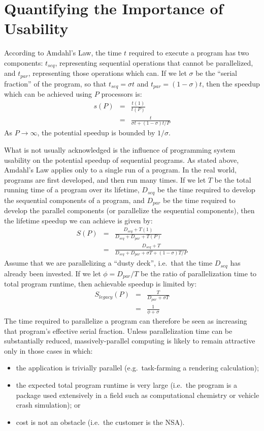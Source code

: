 \section{Quantifying the Importance of Usability\label{s:corollary}}

According to Amdahl's Law,
the time $t$ required to execute a program has two components:
$t_{seq}$, representing sequential operations that cannot be parallelized,
and $t_{par}$, representing those operations which can.
If we let $\sigma$ be the ``serial fraction'' of the program,
so that $t_{seq} = {\sigma}t$ and $t_{par} = (1-{\sigma})t$,
then the speedup which can be achieved using $P$ processors is:
\begin{eqnarray*}
s(P)	& =	& \frac{t(1)}{t(P)}	\\
	& =	& \frac{t}{{{\sigma}t} + {{(1-{\sigma})t}}/{P}}
\end{eqnarray*}
As $P{\rightarrow}{\infty}$,
the potential speedup is bounded by $1/{\sigma}$.

What is not usually acknowledged is
the influence of programming system usability on
the potential speedup of sequential programs.
As stated above, Amdahl's Law applies only to a single run of a program.
In the real world, programs are first developed, and then run many times.
If we let $T$ be the total running time of a program over its lifetime,
$D_{seq}$ be the time required to develop the sequential components of a program,
and $D_{par}$ be the time required to develop the parallel components
(or parallelize the sequential components),
then the lifetime speedup we can achieve is given by:
\begin{eqnarray*}
S(P)	& =	& \frac{D_{seq} + T(1)}{D_{seq} + D_{par} + T(P)}	\\
	& =	& \frac{D_{seq} + T}{D_{seq} + D_{par} + {{\sigma}T} + {{(1-{\sigma})T}}/{P}}
\end{eqnarray*}
Assume that we are parallelizing a ``dusty deck'',
i.e.\ that the time $D_{seq}$ has already been invested.
If we let $\phi = D_{par}/T$ be the ratio of parallelization time to total program runtime,
then achievable speedup is limited by:
\begin{eqnarray*}
S_{legacy}(P)	& =	& \frac{T}{D_{par} + {\sigma}T}		\\
		& =	& \frac{1}{{\phi} + {\sigma}}
\end{eqnarray*}
The time required to parallelize a program can therefore be seen
as increasing that program's effective serial fraction.
Unless parallelization time can be substantially reduced,
massively-parallel computing is likely to remain attractive only in those cases in which:
\begin{itemize}
\item	the application is trivially parallel (e.g.\ task-farming a rendering calculation);
\item	the expected total program runtime is very large
	(i.e.\ the program is a package used extensively in a field
	such as computational chemistry or vehicle crash simulation);
	or
\item	cost is not an obstacle (i.e.\ the customer is the NSA).
\end{itemize}

